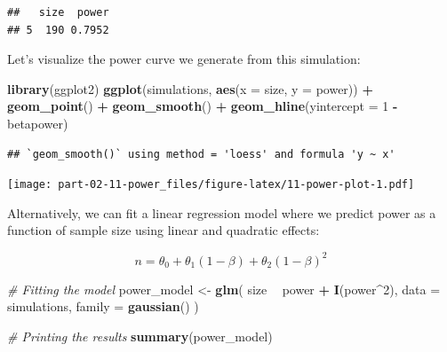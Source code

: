 \documentclass[]{book}
\newenvironment{Shaded}{\begin{snugshade}}{\end{snugshade}}
\newcommand{\CommentTok}[1]{\textcolor[rgb]{0.56,0.35,0.01}{\textit{#1}}}
\newcommand{\DataTypeTok}[1]{\textcolor[rgb]{0.13,0.29,0.53}{#1}}
\newcommand{\DecValTok}[1]{\textcolor[rgb]{0.00,0.00,0.81}{#1}}
\newcommand{\KeywordTok}[1]{\textcolor[rgb]{0.13,0.29,0.53}{\textbf{#1}}}
\newcommand{\NormalTok}[1]{#1}
\newcommand{\OperatorTok}[1]{\textcolor[rgb]{0.81,0.36,0.00}{\textbf{#1}}}
\newcommand{\StringTok}[1]{\textcolor[rgb]{0.31,0.60,0.02}{#1}}
\begin{document}
\begin{verbatim}
##   size  power
## 5  190 0.7952
\end{verbatim}

Let's visualize the power curve we generate from this simulation:

\begin{Shaded}
\begin{Highlighting}[]
\KeywordTok{library}\NormalTok{(ggplot2)}
\KeywordTok{ggplot}\NormalTok{(simulations, }\KeywordTok{aes}\NormalTok{(}\DataTypeTok{x =}\NormalTok{ size, }\DataTypeTok{y =}\NormalTok{ power)) }\OperatorTok{+}
\StringTok{    }\KeywordTok{geom_point}\NormalTok{() }\OperatorTok{+}
\StringTok{    }\KeywordTok{geom_smooth}\NormalTok{() }\OperatorTok{+}
\StringTok{    }\KeywordTok{geom_hline}\NormalTok{(}\DataTypeTok{yintercept =} \DecValTok{1} \OperatorTok{-}\StringTok{ }\NormalTok{betapower)}
\end{Highlighting}
\end{Shaded}

\begin{verbatim}
## `geom_smooth()` using method = 'loess' and formula 'y ~ x'
\end{verbatim}

\texttt{[image: part-02-11-power\_files/figure-latex/11-power-plot-1.pdf]}

Alternatively, we can fit a linear regression model where we predict power as a function of sample size using linear and quadratic effects:

\[
n = \theta_0 + \theta_1 (1 - \beta) + \theta_2 (1 - \beta)^2
\]

\begin{Shaded}
\begin{Highlighting}[]
\CommentTok{# Fitting the model}
\NormalTok{power_model <-}\StringTok{ }\KeywordTok{glm}\NormalTok{(}
\NormalTok{  size }\OperatorTok{~}\StringTok{ }\NormalTok{power }\OperatorTok{+}\StringTok{ }\KeywordTok{I}\NormalTok{(power}\OperatorTok{^}\DecValTok{2}\NormalTok{),}
  \DataTypeTok{data =}\NormalTok{ simulations, }\DataTypeTok{family =} \KeywordTok{gaussian}\NormalTok{()}
\NormalTok{)}

\CommentTok{# Printing the results}
\KeywordTok{summary}\NormalTok{(power_model)}
\end{Highlighting}
\end{Shaded}
\end{document}
